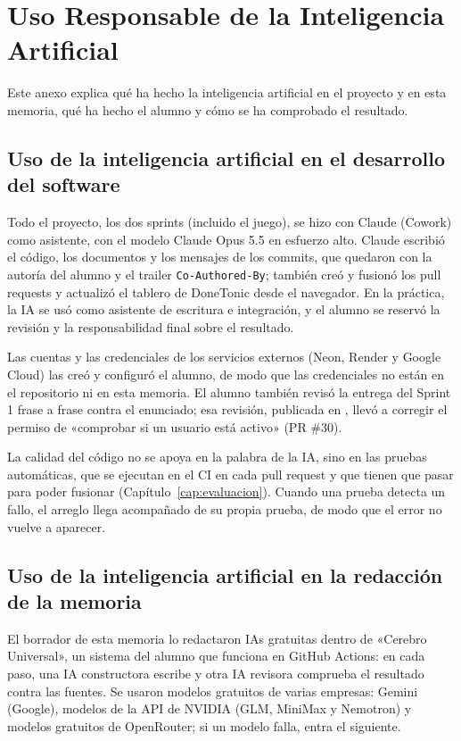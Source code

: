 \chapter{Uso Responsable de la Inteligencia Artificial}
\label{anx:ia}

Este anexo explica qué ha hecho la inteligencia artificial en el proyecto y en esta memoria, qué ha hecho el alumno y cómo se ha comprobado el resultado.

\section{Uso de la inteligencia artificial en el desarrollo del software}

Todo el proyecto, los dos sprints (incluido el juego), se hizo con Claude (Cowork) como asistente, con el modelo Claude Opus 5.5 en esfuerzo alto. Claude escribió el código, los documentos y los mensajes de los commits, que quedaron con la autoría del alumno y el trailer \texttt{Co-Authored-By}; también creó y fusionó los pull requests y actualizó el tablero de DoneTonic desde el navegador. En la práctica, la IA se usó como asistente de escritura e integración, y el alumno se reservó la revisión y la responsabilidad final sobre el resultado.

Las cuentas y las credenciales de los servicios externos (Neon, Render y Google Cloud) las creó y configuró el alumno, de modo que las credenciales no están en el repositorio ni en esta memoria. El alumno también revisó la entrega del Sprint 1 frase a frase contra el enunciado; esa revisión, publicada en , llevó a corregir el permiso de «comprobar si un usuario está activo» (PR \#30).

La calidad del código no se apoya en la palabra de la IA, sino en las pruebas automáticas, que se ejecutan en el CI en cada pull request y que tienen que pasar para poder fusionar (Capítulo~\ref{cap:evaluacion}). Cuando una prueba detecta un fallo, el arreglo llega acompañado de su propia prueba, de modo que el error no vuelve a aparecer.

\section{Uso de la inteligencia artificial en la redacción de la memoria}

El borrador de esta memoria lo redactaron IAs gratuitas dentro de «Cerebro Universal», un sistema del alumno que funciona en GitHub Actions: en cada paso, una IA constructora escribe y otra IA revisora comprueba el resultado contra las fuentes. Se usaron modelos gratuitos de varias empresas: Gemini (Google), modelos de la API de NVIDIA (GLM, MiniMax y Nemotron) y modelos gratuitos de OpenRouter; si un modelo falla, entra el siguiente.

